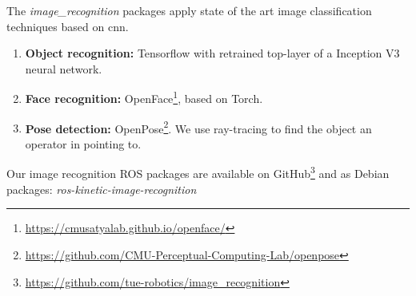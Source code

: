 The \emph{image\_recognition} packages apply state of the art image classification techniques based on \acrfull{cnn}.
\begin{enumerate}

\item \textbf{Object recognition:} Tensorflow\texttrademark\hspace{0em} with retrained top-layer of a Inception V3 neural network.

\item \textbf{Face recognition:} OpenFace\footnote{\url{https://cmusatyalab.github.io/openface/}}, based on Torch.

\item \textbf{Pose detection:} OpenPose\footnote{\url{https://github.com/CMU-Perceptual-Computing-Lab/openpose}}. We use ray-tracing to find the object an operator in pointing to.
\end{enumerate}
Our image recognition ROS packages are available on GitHub\footnote{\url{https://github.com/tue-robotics/image_recognition}} and as Debian packages: \emph{ros-kinetic-image-recognition}
